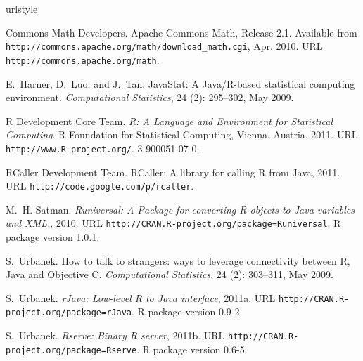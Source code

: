 \documentclass[10pt,a4paper]{article}
\begin{document}
\begin{thebibliography}{8}
\providecommand{\natexlab}[1]{#1}
\providecommand{\url}[1]{\texttt{#1}}
\expandafter\ifx\csname urlstyle\endcsname\relax
  \providecommand{\doi}[1]{doi: #1}\else
  \providecommand{\doi}{doi: \begingroup \urlstyle{rm}\Url}\fi

{Commons Math Developers}.
\newblock Apache Commons Math, Release 2.1.
\newblock Available from
  \url{http://commons.apache.org/math/download_math.cgi}, Apr. 2010.
\newblock URL \url{http://commons.apache.org/math}.

E.~Harner, D.~Luo, and J.~Tan.
\newblock JavaStat: A Java/R-based statistical computing environment.
\newblock \emph{Computational Statistics}, 24 (2): 295--302,
  May 2009.

{R Development Core Team}.
\newblock \emph{R: A Language and Environment for Statistical Computing}.
\newblock R Foundation for Statistical Computing, Vienna, Austria, 2011.
\newblock URL \url{http://www.R-project.org/}.
 3-900051-07-0.

{RCaller Development Team}.
\newblock RCaller: A library for calling R from Java, 2011.
\newblock URL \url{http://code.google.com/p/rcaller}.

M.~H. Satman.
\newblock \emph{Runiversal: A Package for converting R objects to Java
  variables and XML.}, 2010.
\newblock URL \url{http://CRAN.R-project.org/package=Runiversal}.
\newblock R package version 1.0.1.

S.~Urbanek.
\newblock How to talk to strangers: ways to leverage connectivity between R,
  Java and Objective C.
\newblock \emph{Computational Statistics}, 24 (2): 303--311,
  May 2009.

\bibitem[Urbanek(2011{\natexlab{a}})]{Urbanek:2011a}
S.~Urbanek.
\newblock \emph{rJava: Low-level R to Java interface}, 2011{\natexlab{a}}.
\newblock URL \url{http://CRAN.R-project.org/package=rJava}.
\newblock R package version 0.9-2.

\bibitem[Urbanek(2011{\natexlab{b}})]{Urbanek:2011b}
S.~Urbanek.
\newblock \emph{Rserve: Binary R server}, 2011{\natexlab{b}}.
\newblock URL \url{http://CRAN.R-project.org/package=Rserve}.
\newblock R package version 0.6-5.

\end{thebibliography}
\end{document}
